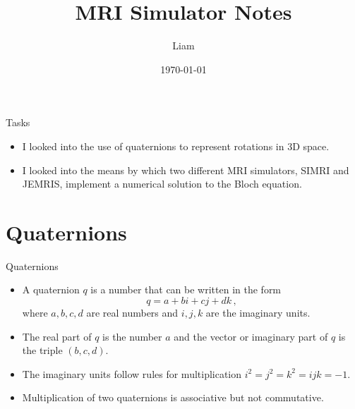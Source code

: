 \documentclass{beamer}
\title{MRI Simulator Notes}
\author{Liam}
\date{\today}
\begin{document}
\begin{frame}
\maketitle
\end{frame}

\begin{frame}{Tasks}
\begin{itemize}
\item I looked into the use of quaternions to represent rotations in 3D space.
\item I looked into the means by which two different MRI simulators, SIMRI and JEMRIS, implement a numerical solution to the Bloch equation.
\end{itemize}
\end{frame}

\section{Quaternions}

\begin{frame}{Quaternions}
\begin{itemize}
\item A quaternion $q$ is a number that can be written in the form
\begin{equation*}
q = a + bi + cj + dk\,,
\end{equation*}
where $a,b,c,d$ are real numbers and $i,j,k$ are the imaginary units.
\item The real part of $q$ is the number $a$ and the vector or imaginary part of $q$ is the triple $(b,c,d)$.
\item The imaginary units follow rules for multiplication $i^2 = j^2 = k^2 = ijk = -1$.
\item Multiplication of two quaternions is associative but not commutative.
\end{itemize}
\end{frame}
\end{document}
